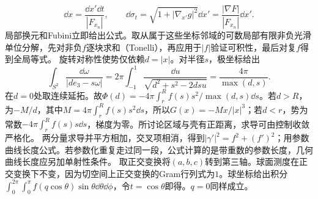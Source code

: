 \documentclass[UTF8,fontset=fandol,11pt]{ctexart}
\begin{document}
\[\dd x=\frac{\dd x'\dd t}{|F_{x_n}|},\qquad \dd\sigma_t=\sqrt{1+|\nabla_{x'}g|^2}\dd x'=\frac{|\nabla F|}{|F_{x_n}|}\dd x'.\]
局部换元和Fubini立即给出公式。取从属于这些坐标邻域的可数局部有限非负光滑单位分解，先对非负$f$逐块求和（Tonelli），再应用于$|f|$验证可积性，最后对复$f$得到全局等式。
旋转对称性使势仅依赖$d=|x|$。对半径$s$，极坐标给出
\[\int_{S^2}\frac{\dd\omega}{|de_3-s\omega|}=2\pi\int_{-1}^1\frac{\dd u}{\sqrt{d^2+s^2-2dsu}}=\frac{4\pi}{\max(d,s)}.\]
在$d=0$处取连续延拓。故$\Phi(d)=-4\pi\int_r^R f(s)s^2/\max(d,s)\dd s$。若$d>R$，为$-M/d$，其中$M=4\pi\int_r^Rf(s)s^2\dd s$，所以$G(x)=-Mx/|x|^3$；若$d<r$，势为常数$-4\pi\int_r^Rf(s)s\dd s$，梯度为零。所讨论区域与壳有正距离，求导可由控制收敛严格化。
两分量求导并平方相加，交叉项相消，得到$|\gamma'|^2=f^2+(f')^2$；用参数曲线长度公式。若参数化重复走过同一段，公式计算的是带重数的参数长度，几何曲线长度应另加单射性条件。
取正交变换将$(a,b,c)$转到第三轴。球面测度在正交变换下不变，因为切空间上正交变换的Gram行列式为$1$。球坐标给出积分$\int_0^{2\pi}\int_0^\pi f(q\cos\theta)\sin\theta\dd\theta\dd\phi$，令$t=\cos\theta$即得。$q=0$同样成立。
\originalpages
\end{document}
